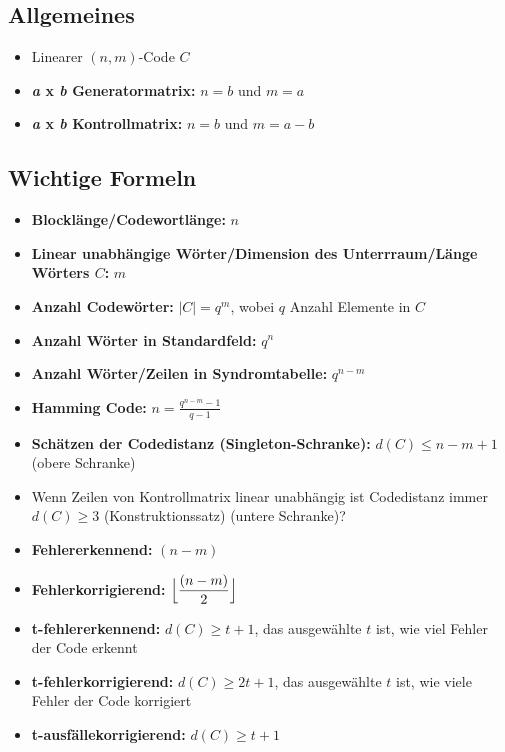 \subsection{Allgemeines}

\begin{itemize}
\item Linearer $(n,m)$-Code $C$
\item \textbf{\textit{a} x \textit{b} Generatormatrix:} $n = b$ und $m = a$
\item \textbf{\textit{a} x \textit{b} Kontrollmatrix:} $n = b$ und $m = a-b$
\end{itemize}

\subsection{Wichtige Formeln}

\begin{itemize}
\item \textbf{Blocklänge/Codewortlänge:} $\displaystyle n$
\item \textbf{Linear unabhängige Wörter/Dimension des Unterrraum/Länge Wörters $C$:} $m$
\item \textbf{Anzahl Codewörter:} $|C| = q^m$, wobei $q$ Anzahl Elemente in $C$
\item \textbf{Anzahl Wörter in Standardfeld:} $q^n$
\item \textbf{Anzahl Wörter/Zeilen in Syndromtabelle:} $q^{n-m}$
\item \textbf{Hamming Code:} $\displaystyle n = \frac{q^{n-m}-1}{q-1}$
\item \textbf{Schätzen der Codedistanz (Singleton-Schranke):} $d(C) \leq n - m + 1$ (obere Schranke)
\item Wenn Zeilen von Kontrollmatrix linear unabhängig ist Codedistanz immer $ d(C) \geq 3$ (Konstruktionssatz) (untere Schranke)?
\item \textbf{Fehlererkennend:} $(n - m)$
\item \textbf{Fehlerkorrigierend:} $\displaystyle \Bigl\lfloor \frac{(n - m)}{2} \Bigr\rfloor$
\item \textbf{t-fehlererkennend:} $d(C) \geq t + 1$, das ausgewählte $t$ ist, wie viel Fehler der Code erkennt
\item \textbf{t-fehlerkorrigierend:} $d(C) \geq 2t + 1$, das ausgewählte $t$ ist, wie viele Fehler der Code korrigiert
\item \textbf{t-ausfällekorrigierend:} $d(C) \geq t + 1$
\end{itemize}\



